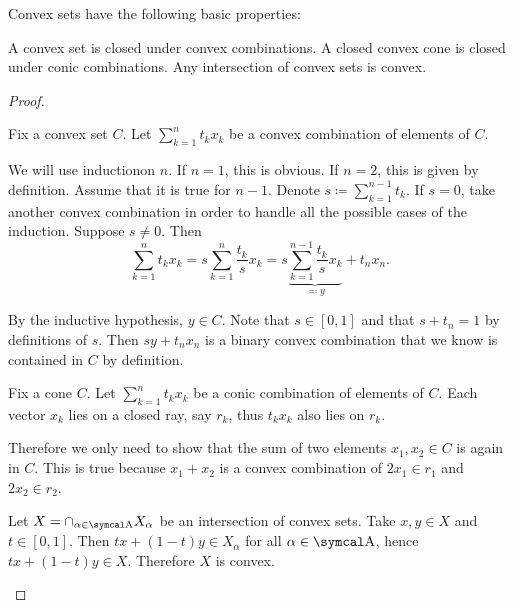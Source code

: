 \begin{proposition}\label{thm:convex_set_properties}
  Convex sets have the following basic properties:

  \begin{propenum}
     A convex set is closed under convex combinations.
     A closed convex cone is closed under conic combinations.
     Any intersection of convex sets is convex.
  \end{propenum}
\end{proposition}
\begin{proof}\mbox{}
  \begin{description}
     Fix a convex set \( C \). Let \( \sum_{k=1}^n t_k x_k \) be a convex combination of elements of \( C \).

    We will use induction\IND on \( n \). If \( n = 1 \), this is obvious. If \( n = 2 \), this is given by definition. Assume that it is true for \( n - 1 \). Denote \( s \coloneqq \sum_{k=1}^{n-1} t_k \). If \( s = 0 \), take another convex combination in order to handle all the possible cases of the induction\IND. Suppose \( s \neq 0 \). Then
    \begin{equation*}
      \sum_{k=1}^n t_k x_k
      =
      s \sum_{k=1}^n \frac {t_k} s x_k
      =
      s \underbrace{\sum_{k=1}^{n-1} \frac {t_k} s x_k}_{\eqqcolon y} + t_n x_n.
    \end{equation*}

    By the inductive hypothesis, \( y \in C \). Note that \( s \in [0, 1] \) and that \( s + t_n = 1 \) by definitions of \( s \). Then \( s y + t_n x_n \) is a binary convex combination that we know is contained in \( C \) by definition.

     Fix a cone \( C \). Let \( \sum_{k=1}^n t_k x_k \) be a conic combination of elements of \( C \). Each vector \( x_k \) lies on a closed ray, say \( r_k \), thus \( t_k x_k \) also lies on \( r_k \).

    Therefore we only need to show that the sum of two elements \( x_1, x_2 \in C \) is again in \( C \). This is true because \( x_1 + x_2 \) is a convex combination of \( 2x_1 \in r_1 \) and \( 2x_2 \in r_2 \).

     Let \( X = \cap_{\alpha \in \CA} X_\alpha \) be an intersection of convex sets. Take \( x, y \in X \) and \( t \in [0, 1] \). Then \( tx + (1-t)y \in X_\alpha \) for all \( \alpha \in \CA \), hence \( tx + (1-t)y \in X \). Therefore \( X \) is convex.
  \end{description}
\end{proof}

